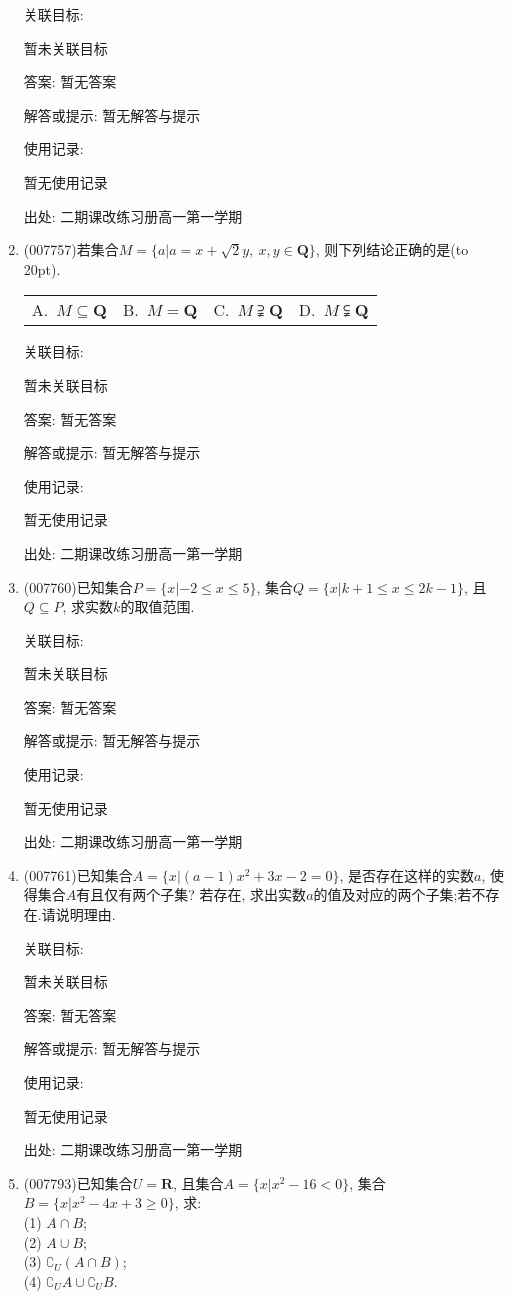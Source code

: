 \documentclass[10pt,a4paper]{article}
\newcommand{\bracket}[1]{(\hbox to #1pt{})}
\newcommand{\fourch}[4]{\par\begin{tabular}{p{.23\textwidth}p{.23\textwidth}p{.23\textwidth}p{.23\textwidth}}
A.~#1 &B.~#2& C.~#3& D.~#4
\end{tabular}}
\begin{document}
\begin{enumerate}[1.]
关联目标:

暂未关联目标

答案: 暂无答案

解答或提示: 暂无解答与提示

使用记录:

暂无使用记录


出处: 二期课改练习册高一第一学期
\item { (007757)}若集合$M=\{a|a=x+\sqrt 2y,\ x,y\in \mathbf{Q}\}$, 则下列结论正确的是\bracket{20}.
\fourch{$M\subseteq \mathbf{Q}$}{$M=\mathbf{Q}$}{$M\supsetneqq \mathbf{Q}$}{$M\subsetneqq \mathbf{Q}$}


关联目标:

暂未关联目标

答案: 暂无答案

解答或提示: 暂无解答与提示

使用记录:

暂无使用记录


出处: 二期课改练习册高一第一学期
\item { (007760)}已知集合$P=\{x|-2\le x\le 5\}$, 集合$Q=\{x|k+1\le x\le 2k-1\}$, 且$Q\subseteq P$, 求实数$k$的取值范围.


关联目标:

暂未关联目标

答案: 暂无答案

解答或提示: 暂无解答与提示

使用记录:

暂无使用记录


出处: 二期课改练习册高一第一学期
\item { (007761)}已知集合$A=\{x|(a-1)x^2+3x-2=0\}$, 是否存在这样的实数$a$, 使得集合$A$有且仅有两个子集? 若存在, 求出实数$a$的值及对应的两个子集;若不存在.请说明理由.


关联目标:

暂未关联目标

答案: 暂无答案

解答或提示: 暂无解答与提示

使用记录:

暂无使用记录


出处: 二期课改练习册高一第一学期
\item { (007793)}已知集合$U=\mathbf{R}$, 且集合$A=\{x|x^2-16<0\}$, 集合$B=\{x|x^2-4x+3\ge 0\}$, 求:\\
(1) $A\cap B$;\\
(2) $A\cup B$;\\
(3) $\complement _U(A\cap B)$;\\
(4) $\complement _UA\cup \complement _UB$.



\end{enumerate}
\end{document}
